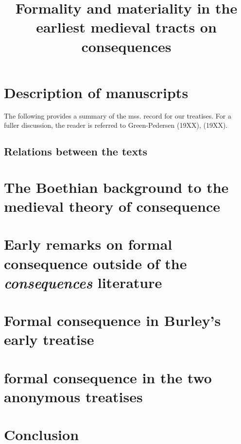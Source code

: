 \documentclass[]{article}
\title{Formality and materiality in the earliest medieval tracts on consequences}
\author{}
\begin{document}
\maketitle

\begin{abstract}

\end{abstract}

\section{Description of manuscripts}
The following provides a summary of the mss. record for our treatises. For a fuller discussion, the reader is referred to Green-Pedersen (19XX), (19XX). 
\subsection{Relations between the texts}
\section{The Boethian background to the medieval theory of consequence}
\section{Early remarks on formal consequence outside of the \textit{consequences} literature}
\section{Formal consequence in Burley's early treatise}
\section{formal consequence in the two anonymous treatises}
\section{Conclusion}
\end{document}
